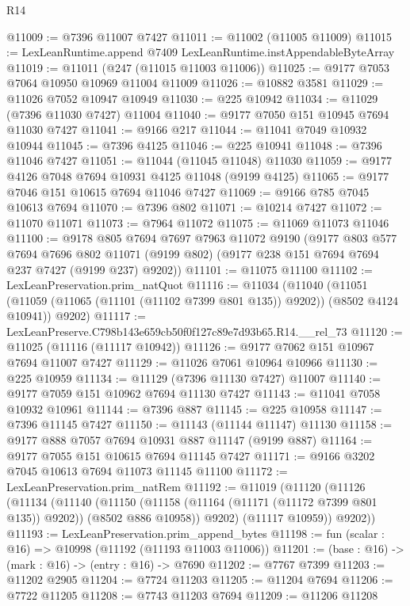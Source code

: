 \begin{lexlean}{R14}
\begin{coremodule}
@11009 := @7396 @11007 @7427
@11011 := @11002 (@11005 @11009)
@11015 := LexLeanRuntime.append @7409 LexLeanRuntime.instAppendableByteArray
@11019 := @11011 (@247 (@11015 @11003 @11006))
@11025 := @9177 @7053 @7064 @10950 @10969 @11004 @11009
@11026 := @10882 @3581
@11029 := @11026 @7052 @10947 @10949
@11030 := @225 @10942
@11034 := @11029 (@7396 @11030 @7427) @11004
@11040 := @9177 @7050 @151 @10945 @7694 @11030 @7427
@11041 := @9166 @217
@11044 := @11041 @7049 @10932 @10944
@11045 := @7396 @4125
@11046 := @225 @10941
@11048 := @7396 @11046 @7427
@11051 := @11044 (@11045 @11048) @11030
@11059 := @9177 @4126 @7048 @7694 @10931 @4125 @11048 (@9199 @4125)
@11065 := @9177 @7046 @151 @10615 @7694 @11046 @7427
@11069 := @9166 @785 @7045 @10613 @7694
@11070 := @7396 @802
@11071 := @10214 @7427
@11072 := @11070 @11071
@11073 := @7964 @11072
@11075 := @11069 @11073 @11046
@11100 := @9178
    @805
    @7694
    @7697
    @7963
    @11072
    @9190
    (@9177
      @803
      @577
      @7694
      @7696
      @802
      @11071
      (@9199 @802)
      (@9177 @238 @151 @7694 @7694 @237 @7427 (@9199 @237) @9202))
@11101 := @11075 @11100
@11102 := LexLeanPreservation.prim_natQuot
@11116 := @11034
    (@11040
      (@11051 (@11059 (@11065 (@11101 (@11102 @7399 @801 @135)) @9202)) (@8502 @4124 @10941))
      @9202)
@11117 := LexLeanPreserve.C798b143e659cb50f0f127c89e7d93b65.R14.__rel_73
@11120 := @11025 (@11116 (@11117 @10942))
@11126 := @9177 @7062 @151 @10967 @7694 @11007 @7427
@11129 := @11026 @7061 @10964 @10966
@11130 := @225 @10959
@11134 := @11129 (@7396 @11130 @7427) @11007
@11140 := @9177 @7059 @151 @10962 @7694 @11130 @7427
@11143 := @11041 @7058 @10932 @10961
@11144 := @7396 @887
@11145 := @225 @10958
@11147 := @7396 @11145 @7427
@11150 := @11143 (@11144 @11147) @11130
@11158 := @9177 @888 @7057 @7694 @10931 @887 @11147 (@9199 @887)
@11164 := @9177 @7055 @151 @10615 @7694 @11145 @7427
@11171 := @9166 @3202 @7045 @10613 @7694 @11073 @11145 @11100
@11172 := LexLeanPreservation.prim_natRem
@11192 := @11019
    (@11120
      (@11126
        (@11134
          (@11140
            (@11150 (@11158 (@11164 (@11171 (@11172 @7399 @801 @135)) @9202)) (@8502 @886 @10958))
            @9202)
          (@11117 @10959))
        @9202))
@11193 := LexLeanPreservation.prim_append_bytes
@11198 := fun (scalar : @16) => @10998 (@11192 (@11193 @11003 @11006))
@11201 := (base : @16) -> (mark : @16) -> (entry : @16) -> @7690
@11202 := @7767 @7399
@11203 := @11202 @2905
@11204 := @7724 @11203
@11205 := @11204 @7694
@11206 := @7722 @11205
@11208 := @7743 @11203 @7694
@11209 := @11206 @11208

\end{coremodule}
\end{lexlean}
